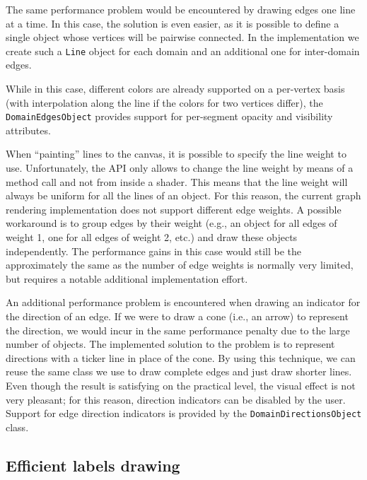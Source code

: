 The same performance problem would be encountered by drawing edges one line at a time. In this case, the solution is even easier, as it is possible to define a single object whose vertices will be pairwise connected. In the implementation we create such a \texttt{Line} object for each domain and an additional one for inter-domain edges.

While in this case, different colors are already supported on a per-vertex basis (with interpolation along the line if the colors for two vertices differ), the \texttt{DomainEdgesObject} provides support for per-segment opacity and visibility attributes.

When ``painting'' lines to the canvas, it is possible to specify the line weight to use. Unfortunately, the API only allows to change the line weight by means of a method call and not from inside a shader. This means that the line weight will always be uniform for all the lines of an object. For this reason, the current graph rendering implementation does not support different edge weights. A possible workaround is to group edges by their weight (e.g., an object for all edges of weight 1, one for all edges of weight 2, etc.) and draw these objects independently. The performance gains in this case would still be the approximately the same as the number of edge weights is normally very limited, but requires a notable additional implementation effort.

An additional performance problem is encountered when drawing an indicator for the direction of an edge. If we were to draw a cone (i.e., an arrow) to represent the direction, we would incur in the same performance penalty due to the large number of objects. The implemented solution to the problem is to represent directions with a ticker line in place of the cone. By using this technique, we can reuse the same class we use to draw complete edges and just draw shorter lines. Even though the result is satisfying on the practical level, the visual effect is not very pleasant; for this reason, direction indicators can be disabled by the user. Support for edge direction indicators is provided by the \texttt{DomainDirectionsObject} class.

\subsection{Efficient labels drawing}

